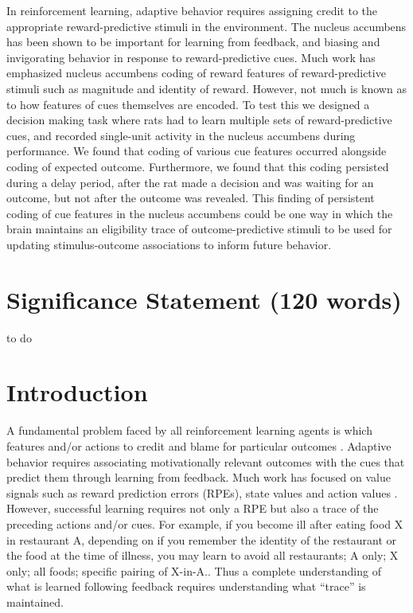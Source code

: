 \documentclass[11pt]{article}
\let\cite=\citep
\begin{document}
In reinforcement learning, adaptive behavior requires assigning credit to the appropriate reward-predictive stimuli in the environment. The nucleus accumbens has been shown to be important for learning from feedback, and biasing and invigorating behavior in response to reward-predictive cues. Much work has emphasized nucleus accumbens coding of reward features of reward-predictive stimuli such as magnitude and identity of reward. However, not much is known as to how features of cues themselves are encoded. To test this we designed a decision making task where rats had to learn multiple sets of reward-predictive cues, and recorded single-unit activity in the nucleus accumbens during performance. We found that coding of various cue features occurred alongside coding of expected outcome. Furthermore, we found that this coding persisted during a delay period, after the rat made a decision and was waiting for an outcome, but not after the outcome was revealed. This finding of persistent coding of cue features in the nucleus accumbens could be one way in which the brain maintains an eligibility trace of outcome-predictive stimuli to be used for updating stimulus-outcome associations to inform future behavior.

\section*{Significance Statement (120 words)}

to do

\newpage

\section*{Introduction}

A fundamental problem faced by all reinforcement learning agents is which features and/or actions to credit and blame for particular outcomes \cite{sutton1998}. Adaptive behavior requires associating motivationally relevant outcomes with the cues that predict them through learning from feedback. Much work has focused on value signals such as reward prediction errors (RPEs), state values and action values \cite{Lee2012,Maia2009}. However, successful learning requires not only a RPE but also a trace of the preceding actions and/or cues. For example, if you become ill after eating food X in restaurant A, depending on if you remember the identity of the restaurant or the food at the time of illness, you may learn to avoid {all restaurants; A only; X only; all foods; specific pairing of X-in-A.}. Thus a complete understanding of what is learned following feedback requires understanding what “trace” is maintained.
\end{document}
